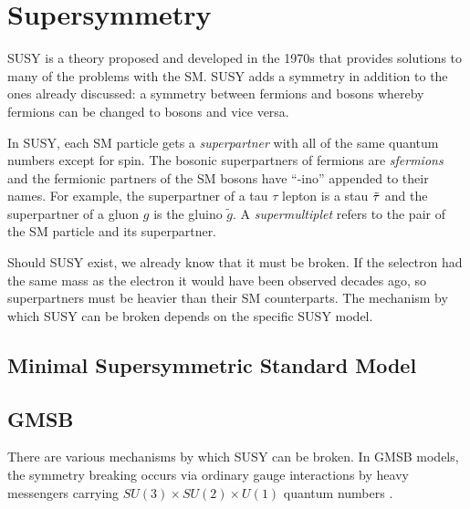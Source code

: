 

\section{Supersymmetry}

\acf{SUSY} is a theory proposed and developed in the 1970s \cite{susy-found-1,susy-found-2,susy-found-3} that provides solutions to many of the problems with the \ac{SM}. \ac{SUSY} adds a symmetry in addition to the ones already discussed: a symmetry between fermions and bosons whereby fermions can be changed to bosons and vice versa. 

In \ac{SUSY}, each \ac{SM} particle gets a \emph{superpartner} with all of the same quantum numbers except for spin. The bosonic superpartners of fermions are \emph{sfermions} and the fermionic partners of the \ac{SM} bosons have ``-ino'' appended to their names. For example, the superpartner of a tau $\tau$ lepton is a stau $\tilde{\tau}$ and the superpartner of a gluon $g$ is the gluino $\tilde{g}$. A \emph{supermultiplet} refers to the pair of the \ac{SM} particle and its superpartner.

Should \ac{SUSY} exist, we already know that it must be broken. If the selectron had the same mass as the electron it would have been observed decades ago, so superpartners must be heavier than their \ac{SM} counterparts. The mechanism by which \ac{SUSY} can be broken depends on the specific \ac{SUSY} model.

\subsection{Minimal Supersymmetric Standard Model}



\subsection{GMSB}
\label{sec:gmsb}

There are various mechanisms by which \ac{SUSY} can be broken. In \acf{GMSB} models, the symmetry breaking occurs via ordinary gauge interactions by heavy messengers carrying $SU(3) \times SU(2) \times U(1)$ quantum numbers \cite{gmsb-lep,Dimopoulos_1996,Ambrosanio_1997}. 



